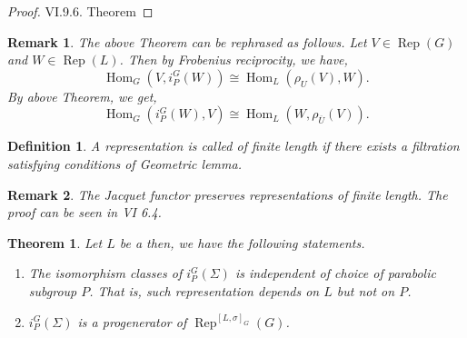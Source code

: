 \documentclass[8pt]{article}
\newtheorem{theorem}{Theorem} [section]
\newtheorem{definition}{Definition}[section]
\newtheorem{remark}{Remark}[section]
\DeclareMathOperator{\Rep}{Rep}
\DeclareMathOperator{\Hom}{Hom}
\begin{document}
  \begin{proof}
    \cite{Renard} VI.9.6. Theorem
  \end{proof}
  \begin{remark}
    The above Theorem can be rephrased as follows. Let $V\in\Rep(G)$ and $W\in\Rep(L)$. Then by Frobenius reciprocity, we have,
    \begin{equation*}
      \Hom_G(V,i_P^G(W)) \cong \Hom_L(\rho_U(V),W).
    \end{equation*}
    By above Theorem, we get,
    \begin{equation*}
      \Hom_G(i_P^G(W),V) \cong \Hom_L(W,\rho_{\overline{U}}(V)).
    \end{equation*}
  \end{remark}
  \begin{definition}
    A representation is called of finite length if there exists a filtration satisfying conditions of Geometric lemma.
  \end{definition}
  \begin{remark}
    The Jacquet functor preserves representations of finite length. The proof can be seen in \cite{Renard} VI 6.4.
  \end{remark}
  \setcounter{claim}{0}
  \begin{theorem}
    \label{theorem_99}
    Let $L$ be a %
    then, we have the following statements.
    \begin{enumerate}[1).]
      \item The isomorphism classes of $i_P^G(\Sigma)$ is independent of choice of parabolic subgroup $P$. That is, such representation depends on $L$ but not on $P$.
      \item $i_P^G(\Sigma)$ is a progenerator of $\Rep^{[L,\sigma]_G}(G)$.
    \end{enumerate}
  \end{theorem}
\end{document}
